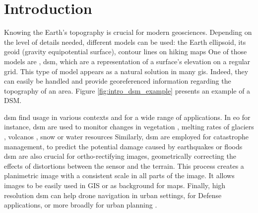 \chapter*{Introduction}
Knowing the Earth's topography is crucial for modern geosciences. Depending on the level of details needed, different models can be used: the Earth ellipsoid, its geoid (gravity equipotential surface), contour lines on hiking maps \etc One of those models are , \acrfull{dsm}, which are a representation of a surface's elevation on a regular grid. This type of model appears as a natural solution in many \acrfull{gis}. Indeed, they can easily be handled and provide georeferenced information regarding the topography of an area. Figure \ref{fig:intro_dsm_example} presents an example of a DSM.

\acrshort{dsm} find usage in various contexts and for a wide range of applications. In \acrfull{eo} for instance, \acrshort{dsm} are used to monitor changes in vegetation \cite{sadeghi_canopy_2016}, melting rates of glaciers \cite{berthier_glacier_2014, rieg_pleiades_2018}, volcanos \cite{ganci_data_2022}, snow or water resources \cite{marti_mapping_2016, gascoin_theia_2019, yamazaki_merit_2019} \etc Similarly, \acrshort{dsm} are employed for catastrophe management, to predict the potential damage caused by earthquakes or floods \cite{jenkins_physics-based_2023} \etc \acrshort{dsm} are also crucial for ortho-rectifying images, \ie geometrically correcting the effects of distortions between the sensor and the terrain. This process creates a planimetric image with a consistent scale in all parts of the image. It allows images to be easily used in GIS or as background for maps. Finally, high resolution \acrshort{dsm} can help drone navigation in urban settings, for Defense applications, or more broadly for urban planning \cite{velazco_3d_2012}.

